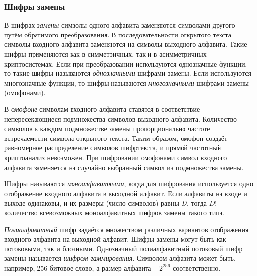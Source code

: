 \subsubsection{Шифры замены}

В шифрах \emph{замены} символы одного алфавита заменяются символами другого путём обратимого преобразования. В последовательности открытого текста символы входного алфавита заменяются на символы выходного алфавита. Такие шифры применяются как в симметричных, так и в асимметричных криптосистемах. Если при преобразовании используются однозначные функции, то такие шифры называются \emph{однозначными} шифрами замены. Если используются многозначные функции, то шифры называются \emph{многозначными} шифрами замены (омофонами).

В \emph{омофоне} символам входного алфавита ставятся в соответствие непересекающиеся подмножества символов выходного алфавита. Количество символов в каждом подмножестве замены пропорционально частоте встречаемости символа открытого текста. Таким образом, омофон создаёт равномерное распределение символов шифртекста, и прямой частотный криптоанализ невозможен. При шифровании омофонами символ входного алфавита заменяется на случайно выбранный символ из подмножества замены.

Шифры называются \emph{моноалфавитными}, когда для шифрования используется одно отображение входного алфавита в выходной алфавит. Если алфавиты на входе и выходе одинаковы, и их размеры (число символов) равны $D$, тогда $D!$ -- количество всевозможных моноалфавитных шифров замены такого типа.

\emph{Полиалфавитный} шифр задаётся множеством различных вариантов отображения входного алфавита на выходной алфавит. Шифры замены могут быть как потоковыми, так и блочными. Однозначный полиалфавитный потоковый шифр замены называется \emph{шифром гаммирования}. Символом алфавита может быть, например, 256-битовое слово, а размер алфавита – $2^{256}$ соответственно.
